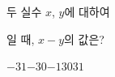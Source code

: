 두 실수 $x$, $y$에 대하여\par\smallskip{}\par\smallskip\noindent 일 때, $x-y$의 값은?
\begin{choices32}{$-31$}{$-30$}{$-1$}{$30$}{$31$}\end{choices32}
